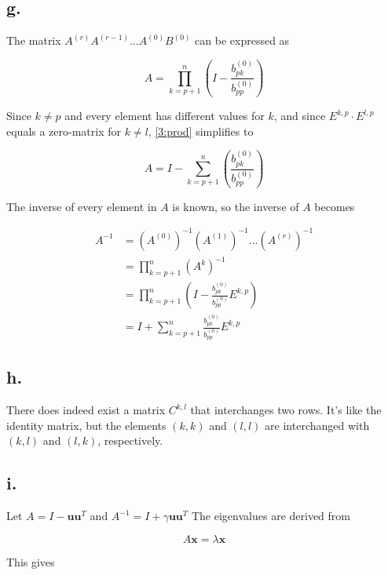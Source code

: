 \documentclass[00-main.tex]{subfiles}
\begin{document}
\subsection*{g.}
The matrix $A^{(r)}A^{(r-1)} ... A^{(0)}B^{(0)}$ can be expressed as

\begin{equation}
\label{3:prod}
A = \prod\limits_{k=p+1}^n ( I - \frac{b^{(0)}_{pk}}{b^{(0)}_{pp}} ) 
\end{equation}

Since $k \neq p$ and every element has different values for $k$, and since $E^{k,p} \cdot E^{l,p}$ equals a zero-matrix for $k \neq l$, \cref{3:prod} simplifies to 

\begin{equation}
\label{prod}
A = I - \sum \limits_{k=p+1}^n ( \frac{b^{(0)}_{pk}}{b^{(0)}_{pp}} ) 
\end{equation}

The inverse of every element in $A$ is known, so the inverse of $A$ becomes

\begin{align*}
A^{-1} &= (A^{(0)})^{-1} (A^{(1)})^{-1} ... (A^{(r)})^{-1} \\
&= \prod\limits_{k=p+1}^n \left( A^k \right)^{-1} \\
&= \prod\limits_{k=p+1}^n \left( I - \frac{b^{(0)}_{pk}}{b^{(0)}_{pp}} E^{k,p} \right) \\
&= I + \sum \limits_{k=p+1}^n \frac{b^{(0)}_{pk}}{b^{(0)}_{pp}} E^{k,p} 
\end{align*}

\subsection*{h.}
There does indeed exist a matrix $C^{k,l}$ that interchanges two rows. It's like the identity matrix, but the elements $(k,k)$ and $(l,l)$ are interchanged with $(k,l)$ and $(l,k)$, respectively.

\subsection*{i.}
Let $A = I - \mathbf{uu}^T$ and $A^{-1} = I + \gamma \mathbf{uu}^T$   The eigenvalues are derived from

\begin{equation}
A \mathbf{x} = \lambda \mathbf{x}
\end{equation}

This gives
\end{document}
